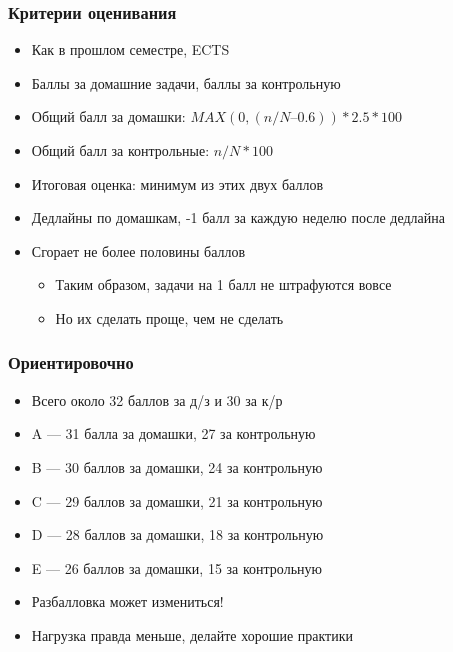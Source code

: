 \documentclass{../../slides-style}
\begin{document}
    \begin{frame}
        \frametitle{Критерии оценивания}
        \begin{itemize}
            \item Как в прошлом семестре, ECTS
            \item Баллы за домашние задачи, баллы за контрольную
            \item Общий балл за домашки: $MAX(0, (n/N – 0.6)) * 2.5 * 100$
            \item Общий балл за контрольные: $n/N * 100$
            \item Итоговая оценка: минимум из этих двух баллов
            \item Дедлайны по домашкам, -1 балл за каждую неделю после дедлайна
            \item Сгорает не более половины баллов
            \begin{itemize}
                \item Таким образом, задачи на 1 балл не штрафуются вовсе
                \item Но их сделать проще, чем не сделать
            \end{itemize}
        \end{itemize}
    \end{frame}

    \begin{frame}
        \frametitle{Ориентировочно}
        \begin{itemize}
            \item Всего около 32 баллов за д/з и 30 за к/р
            \item A --- 31 балла за домашки, 27 за контрольную
            \item B --- 30 баллов за домашки, 24 за контрольную
            \item C --- 29 баллов за домашки, 21 за контрольную
            \item D --- 28 баллов за домашки, 18 за контрольную
            \item E --- 26 баллов за домашки, 15 за контрольную
        \end{itemize}
        
        \vspace{0.5cm}

        \begin{itemize}
            \item Разбалловка может измениться!
            \item Нагрузка правда меньше, делайте хорошие практики
        \end{itemize}
    \end{frame}
\end{document}
